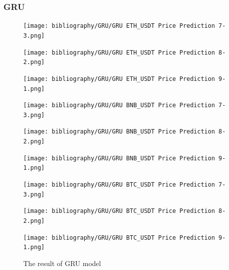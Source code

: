 \documentclass{ieeeojies}
\begin{document}
\subsubsection{GRU}
\begin{figure}[H]
    \centering
    \begin{minipage}{0.15\textwidth}
    \centering
    \texttt{[image: bibliography/GRU/GRU ETH\_USDT Price Prediction 7-3.png]}
    \end{minipage}
    \hfill
    \begin{minipage}{0.15\textwidth}
    \centering
    \texttt{[image: bibliography/GRU/GRU ETH\_USDT Price Prediction 8-2.png]}
    \end{minipage}
    \hfill
    \begin{minipage}{0.15\textwidth}
    \centering
    \texttt{[image: bibliography/GRU/GRU ETH\_USDT Price Prediction 9-1.png]}
    \end{minipage}
    \centering
    \begin{minipage}{0.15\textwidth}
    \centering
    \texttt{[image: bibliography/GRU/GRU BNB\_USDT Price Prediction 7-3.png]}
    \end{minipage}
    \hfill
    \begin{minipage}{0.15\textwidth}
    \centering
    \texttt{[image: bibliography/GRU/GRU BNB\_USDT Price Prediction 8-2.png]}
    \end{minipage}
    \hfill
    \begin{minipage}{0.15\textwidth}
    \centering
    \texttt{[image: bibliography/GRU/GRU BNB\_USDT Price Prediction 9-1.png]}
    \end{minipage}
    \centering
    \begin{minipage}{0.15\textwidth}
    \centering
    \texttt{[image: bibliography/GRU/GRU BTC\_USDT Price Prediction 7-3.png]}
    \end{minipage}
    \hfill
    \begin{minipage}{0.15\textwidth}
    \centering
    \texttt{[image: bibliography/GRU/GRU BTC\_USDT Price Prediction 8-2.png]}
    \end{minipage}
    \hfill
    \begin{minipage}{0.15\textwidth}
    \centering
    \texttt{[image: bibliography/GRU/GRU BTC\_USDT Price Prediction 9-1.png]}
    \end{minipage}
    \caption{The result of GRU model}
    \label{fig:enter-label}
\end{figure}
\end{document}
